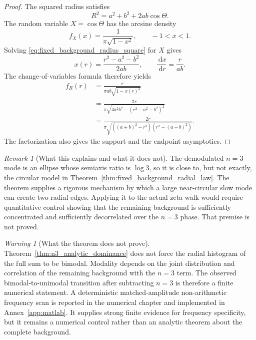 \documentclass[11pt]{amsart}
\numberwithin{equation}{section}
\theoremstyle{plain}
\theoremstyle{definition}
\theoremstyle{remark}
\newtheorem{remark}[theorem]{Remark}
\newtheorem{warning}[theorem]{Warning}
\newcommand{\1}{\mathbf{1}}
\newcommand{\dd}{\,\mathrm{d}}
\begin{document}
\begin{proof}
The squared radius satisfies
\begin{equation}
R^2=a^2+b^2+2ab\cos\Theta.
\label{eq:fixed_background_radius_square}
\end{equation}
The random variable \(X=\cos\Theta\) has the arcsine density
\begin{equation}
f_X(x)=\frac1{\pi\sqrt{1-x^2}},
\qquad -1<x<1.
\label{eq:arcsine_cosine_density}
\end{equation}
Solving \eqref{eq:fixed_background_radius_square} for \(X\) gives
\begin{equation}
x(r)=\frac{r^2-a^2-b^2}{2ab},
\qquad
\frac{\dd x}{\dd r}=\frac{r}{ab}.
\label{eq:radial_change_variables}
\end{equation}
The change-of-variables formula therefore yields
\begin{align}
f_R(r)
&=
\frac{r}{\pi ab\sqrt{1-x(r)^2}}
\label{eq:radial_density_first_form}
\\
&=
\frac{2r}
{\pi\sqrt{4a^2b^2-(r^2-a^2-b^2)^2}}
\label{eq:radial_density_second_form}
\\
&=
\frac{2r}
{\pi\sqrt{((a+b)^2-r^2)(r^2-(a-b)^2)}}.
\label{eq:radial_density_factorized}
\end{align}
The factorization also gives the support and the endpoint asymptotics.
\end{proof}

\begin{remark}[What this explains and what it does not]
\label{rem:n3_fixed_background_mechanism}
The demodulated \(n=3\) mode is an ellipse whose semiaxis ratio is
\(\log3\), so it is close to, but not exactly, the circular model in
Theorem~\ref{thm:fixed_background_radial_law}.  The theorem supplies a
rigorous mechanism by which a large near-circular slow mode can create two
radial edges.  Applying it to the actual zeta walk would require quantitative
control showing that the remaining background is sufficiently concentrated
and sufficiently decorrelated over the \(n=3\) phase.  That premise is not
proved.
\end{remark}

\begin{warning}[What the theorem does not prove]
\label{warn:n3_bimodality_not_analytic}
Theorem~\ref{thm:n3_analytic_dominance} does not force the radial histogram
of the full sum to be bimodal.  Modality depends on the joint distribution
and correlation of the remaining background with the $n=3$ term.  The
observed bimodal-to-unimodal transition after subtracting $n=3$ is therefore
a finite numerical statement.  A deterministic matched-amplitude non-arithmetic frequency scan is
reported in the numerical chapter and implemented in Annex~\ref{app:matlab}.
It supplies strong finite evidence for frequency specificity, but it remains
a numerical control rather than an analytic theorem about the complete
background.
\end{warning}
\end{document}

